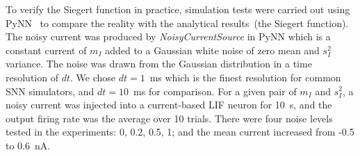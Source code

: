 
	To verify the Siegert function in practice, simulation tests were carried out using PyNN~\citep{davison2008pynn} to compare the reality with the analytical results~(the Siegert function).
	The noisy current was produced by \textit{NoisyCurrentSource} in PyNN which is a constant current of $m_I$ added to a Gaussian white noise of zero mean and $s_I^2$ variance.
	The noise was drawn from the Gaussian distribution in a time resolution of $dt$.
	We chose $dt=1$~ms which is the finest resolution for common SNN simulators, and $dt=10$~ms for comparison.
	For a given pair of $m_I$ and $s_I^2$, a noisy current was injected into a current-based LIF neuron for 10~s, and the output firing rate was the average over 10 trials.
	There were four noise levels tested in the experiments: 0, 0.2, 0.5, 1; and the mean current increased from -0.5 to 0.6~nA.
	
